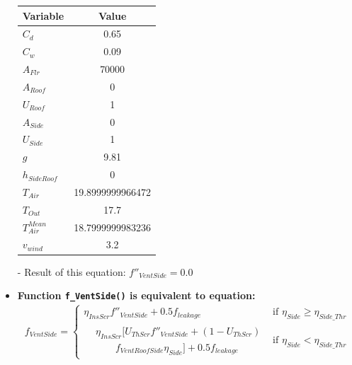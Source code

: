 \documentclass[a4paper]{article}
\numberwithin{equation}{section}
\begin{document}
\begin{itemize}
        \begin{table}[H]
          \centering
          \begin{tabular}{@{}lS[table-format=5.13]@{}}
            \toprule
            \textbf{Variable}  & \textbf{Value}   \\
            \midrule
            \(C_d\)            & 0.65             \\
            \(C_w\)            & 0.09             \\
            \(A_{Flr}\)        & 70000            \\
            \(A_{Roof}\)       & 0                \\
            \(U_{Roof}\)       & 1                \\
            \(A_{Side}\)       & 0                \\
            \(U_{Side}\)       & 1                \\
            \(g\)              & 9.81             \\
            \(h_{SideRoof}\)   & 0                \\
            \(T_{Air}\)        & 19.8999999966472 \\
            \(T_{Out}\)        & 17.7             \\
            \(T_{Air}^{Mean}\) & 18.7999999983236 \\
            \(v_{wind}\)       & 3.2              \\
            \bottomrule
          \end{tabular}
        \end{table}

  \item[-] Result of this equation: \(f''_{VentSide} = 0.0\)

  \item \textbf{Function \texttt{f\_VentSide()} is equivalent to equation:}\label{fVentSide}
        \begin{gather*}
          f_{VentSide} =
          \begin{cases}
            \eta_{InsScr} f''_{VentSide} + 0.5f_{leakage} & \text{if~} \eta_{Side} \geq \eta_{Side\_Thr} \\
            \begin{split}
              & \eta_{InsScr} [U_{ThScr}f''_{VentSide} + (1-U_{ThScr}) \\
              & \qquad f_{VentRoofSide} \eta_{Side}] + 0.5 f_{leakage}
            \end{split}                   & \text{if~} \eta_{Side} < \eta_{Side\_Thr}
          \end{cases}
        \end{gather*}


\end{itemize}
\end{document}
